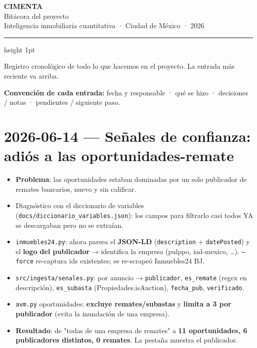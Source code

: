 \documentclass[11pt]{article}
\newcommand{\codigo}[1]{\texttt{#1}}
\begin{document}
\begin{center}
  {\color{azul}\Huge\bfseries CIMENTA}\\[2pt]
  {\color{acento}\large Bitácora del proyecto}\\[6pt]
  {\color{niebla}\small Inteligencia inmobiliaria cuantitativa · Ciudad de México · 2026}
\end{center}
\vspace{6pt}
\hrule height 1pt
\vspace{10pt}

\noindent Registro cronológico de todo lo que hacemos en el proyecto.
La entrada más reciente va arriba.

\textbf{Convención de cada entrada:} fecha y responsable · qué se hizo ·
decisiones / notas · pendientes / siguiente paso.


\section*{2026-06-14 — Señales de confianza: adiós a las oportunidades-remate}

\begin{itemize}
  \item \textbf{Problema}: las oportunidades estaban dominadas por un solo
        publicador de remates bancarios, nuevo y sin calificar.
  \item Diagnóstico con el diccionario de variables
        (\codigo{docs/diccionario\_variables.json}): los campos para filtrarlo casi
        todos YA se descargaban pero no se extraían.
  \item \codigo{inmuebles24.py}: ahora parsea el \textbf{JSON-LD} (\codigo{description}
        + \codigo{datePosted}) y el \textbf{logo del publicador} → identifica la
        empresa (pulppo, iad-mexico, …). \codigo{--force} re-captura ids existentes;
        se re-scrapeó Inmuebles24 BJ.
  \item \codigo{src/ingesta/senales.py}: por anuncio → \codigo{publicador},
        \codigo{es\_remate} (regex en descripción), \codigo{es\_subasta}
        (Propiedades.isAuction), \codigo{fecha\_pub}, \codigo{verificado}.
  \item \codigo{avm.py} oportunidades: \textbf{excluye remates/subastas} y
        \textbf{limita a 3 por publicador} (evita la inundación de una empresa).
  \item \textbf{Resultado}: de "todas de una empresa de remates" a \textbf{11
        oportunidades, 6 publicadores distintos, 0 remates}. La pestaña muestra el
        publicador.
\end{itemize}
\end{document}

